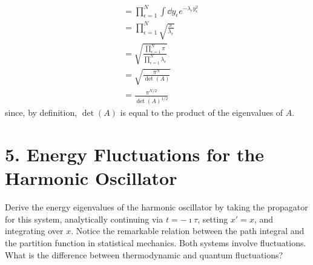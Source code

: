 \documentclass[a4paper,twoside]{article}
\begin{document}
\begin{problem}
\begin{align}
        &= \prod_{\epsilon=1}^{N} \int \dd{y_{\epsilon}} e^{- \lambda_{\epsilon} y_{\epsilon}^2} \\
        &= \prod_{\epsilon=1}^{N} \sqrt{\frac{\pi}{\lambda_{\epsilon}}} \\
        &= \sqrt{\frac{\prod_{\epsilon=1}^{N} \pi}{\prod_{\epsilon=1}^{N} \lambda_{\epsilon}}} \\
        &= \sqrt{\frac{\pi^N}{\det(A)}} \\
        &= \frac{\pi^{N/2}}{\det(A)^{1/2}}
    \end{align}
    since, by definition, $ \det(A) $ is equal to the product of the eigenvalues of $ A $.
\end{problem}

\section*{5. Energy Fluctuations for the Harmonic Oscillator}
Derive the energy eigenvalues of the harmonic oscillator by taking the propagator for this system, analytically continuing via $ t = - \imath \tau $, setting $ x' = x $, and integrating over $ x $. Notice the remarkable relation between the path integral and the partition function in statistical mechanics. Both systems involve fluctuations. What is the difference between thermodynamic and quantum fluctuations?
\end{document}
